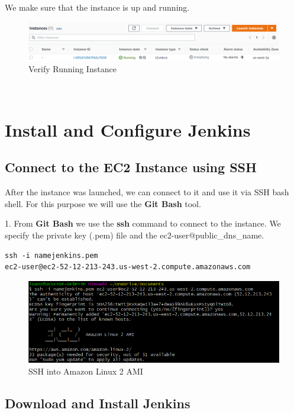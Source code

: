 \documentclass[12pt,a4paper,twoside]{article}
\begin{document}
We make sure that the instance is up and running.


\begin{figure}[H]
    \centering
        \includegraphics[width=15cm]{images-aws/12-running-instance.png}
        \caption{Verify Running Instance}
\end{figure}



~\newpage


\section{Install and Configure Jenkins}


\subsection{Connect to the EC2 Instance using SSH}


After the instance was launched, we can connect to it and use it via SSH bash shell. For this purpose we will use the \textbf{Git Bash} tool.


1. From \textbf{Git Bash} we use the \textbf{ssh} command to connect to the instance. We specify the private key (.pem) file and the ec2-user@public\_dns\_name.

\begin{verbatim}
ssh -i namejenkins.pem 
ec2-user@ec2-52-12-213-243.us-west-2.compute.amazonaws.com
\end{verbatim}

\begin{figure}[H]
    \centering
        \includegraphics[width=15cm]{images-aws/13-ssh-connect.png}
        \caption{SSH into Amazon Linux 2 AMI}
\end{figure}


\subsection{Download and Install Jenkins}
\end{document}
